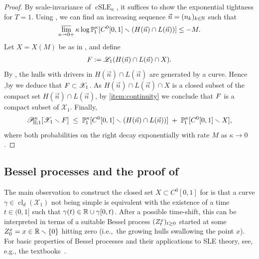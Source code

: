 \documentclass[a4paper, 11pt]{article}
\theoremstyle{definition}
\numberwithin{equation}{section}
\numberwithin{figure}{section}
\renewcommand{\limsup}{\varlimsup}
\newcommand{\cSLE}[1][]{\operatorname{cSLE}_{#1}}
\newcommand{\cLoewnerTransform}[1][]{\mathscr{L}_{\ifx&#1&\else#1\fi}}
\newcommand{\bessel}[1][]{{\ifx&#1&\else{^{#1 \!}}\fi}Z}
\newcommand{\funs}[2][]{C^{0}_{#1}[0,#2}
\newcommand{\Hpaths}[1][]{\mathscr{X}_{#1}} %
\newcommand{\Hpathscl}[1][]{\operatorname{cl}_{d}(\Hpaths[#1])}
\newcommand{\cHmeasure}[2][]{\mathscr{P}^{#2}_{\!\bH;#1}}
\newcommand{\BMmeasure}[2][]{\bP^{#2}_{\!#1}}
\begin{document}
\begin{proof}
By scale-invariance of $\cSLE[\kappa]$, it suffices to show the exponential tightness for $T=1$.
Using , we can find an increasing sequence $\vec n = (n_k)_{k \in \mathbb{N}}$ such that
\begin{align*}
\limsup_{\kappa \to 0+}\kappa\log\BMmeasure[1]{\kappa}[ \funs{1]} \smallsetminus (H(\vec n) \cap L(\vec n))] \le -M.
\end{align*}
Let $X = X(M)$ be as in , and define
\begin{align*}
\compact := \cLoewnerTransform[1]( H(\vec n) \cap L(\vec n) \cap X).
\end{align*}
By , the hulls with drivers in $H(\vec n) \cap L(\vec n)$ are generated by a curve.
Hence ,by  we deduce that $\compact \subset \Hpaths[1]$. 
As $H(\vec n) \cap L(\vec n) \cap X$ is a closed subset of the compact set $H(\vec n) \cap L(\vec n)$, 
by \ref{item:continuity} we conclude that $F$ is a compact subset of $\Hpaths[1]$. 
Finally,
\begin{align*}
\cHmeasure[1]{\kappa}[\Hpaths[1] \smallsetminus \compact] 
\; \le \; \BMmeasure[1]{\kappa}[ \funs{1]} \smallsetminus (H(\vec n) \cap L(\vec n))] 
\; + \; \BMmeasure[1]{\kappa}[ \funs{1]} \smallsetminus X],
\end{align*} 
where both probabilities on the right decay exponentially with rate $M$ as $\kappa \to 0$.
\end{proof}

\subsection{Bessel processes and the proof of } 
\label{sec:proof-of-exponentially-tight-function-set}


The main observation to construct the closed set $X \subset \funs{1]}$ for 
 is that 
a curve $\gamma \in \Hpathscl[1]$ not being simple is equivalent with 
the existence of a time $t \in (0,1]$ such that $\gamma(t) \in \mathbb{R}\cup\gamma[0,t)$. After a possible time-shift, 
this can be interpreted in terms of a suitable Bessel process $(\bessel^x_t)_{t \geq 0}$ started at some $\bessel^x_0 = x \in \bR \smallsetminus \{0\}$ hitting zero 
(i.e.,~the growing hulls swallowing the point $x$).  
For basic properties of Bessel processes and their applications to SLE theory, see, e.g., the textbooks~\cite{Lawler:Conformally_invariant_processes_in_the_plane,Kemppainen:SLE_book, Lawler:SLE_book_draft}. 
\end{document}

